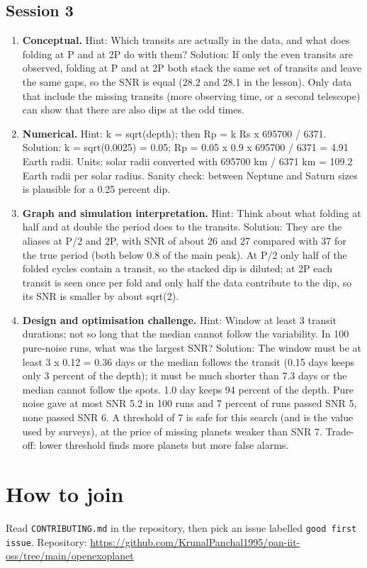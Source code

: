 \documentclass[11pt,a4paper]{article}
\begin{document}
\subsection*{Session 3}
\begin{enumerate}[nosep]
\item \textbf{Conceptual.} Hint: Which transits are actually in the data, and what does folding at P and at 2P do with them? Solution: If only the even transits are observed, folding at P and at 2P both stack the same set of transits and leave the same gaps, so the SNR is equal (28.2 and 28.1 in the lesson). Only data that include the missing transits (more observing time, or a second telescope) can show that there are also dips at the odd times.
\item \textbf{Numerical.} Hint: k = sqrt(depth); then Rp = k Rs x 695700 / 6371. Solution: k = sqrt(0.0025) = 0.05; Rp = 0.05 x 0.9 x 695700 / 6371 = 4.91 Earth radii. Units: solar radii converted with 695700 km / 6371 km = 109.2 Earth radii per solar radius. Sanity check: between Neptune and Saturn sizes is plausible for a 0.25 percent dip.
\item \textbf{Graph and simulation interpretation.} Hint: Think about what folding at half and at double the period does to the transits. Solution: They are the aliases at P/2 and 2P, with SNR of about 26 and 27 compared with 37 for the true period (both below 0.8 of the main peak). At P/2 only half of the folded cycles contain a transit, so the stacked dip is diluted; at 2P each transit is seen once per fold and only half the data contribute to the dip, so its SNR is smaller by about sqrt(2).
\item \textbf{Design and optimisation challenge.} Hint: Window at least 3 transit durations; not so long that the median cannot follow the variability. In 100 pure-noise runs, what was the largest SNR? Solution: The window must be at least 3 x 0.12 = 0.36 days or the median follows the transit (0.15 days keeps only 3 percent of the depth); it must be much shorter than 7.3 days or the median cannot follow the spots. 1.0 day keeps 94 percent of the depth. Pure noise gave at most SNR 5.2 in 100 runs and 7 percent of runs passed SNR 5, none passed SNR 6. A threshold of 7 is safe for this search (and is the value used by surveys), at the price of missing planets weaker than SNR 7. Trade-off: lower threshold finds more planets but more false alarms.
\end{enumerate}

\section{How to join}
Read \texttt{CONTRIBUTING.md} in the repository, then pick an issue labelled \texttt{good first issue}. Repository: \url{https://github.com/KrunalPanchal1995/pan-iit-oss/tree/main/openexoplanet}
\end{document}
